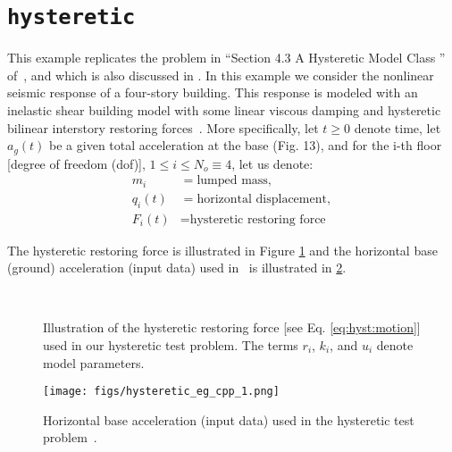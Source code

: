 \section{\texttt{hysteretic}}\label{sec:example_hysteretic}

This example replicates the problem in ``Section 4.3 A Hysteretic Model Class
'' of~\cite{CheungPrudencio2012}, and which is also discussed in \cite{Cheung_2009A}.
In this example we consider the nonlinear seismic response of a four-story building. 
This response is modeled with
an inelastic shear building model with some linear viscous damping and hysteretic bilinear interstory restoring forces~\cite{Cheung_2009A}. More
specifically, let $t\geq0 $ denote time, let $a_g(t)$ be a given total acceleration at the base (Fig. 13), and for the i-th floor [degree of freedom (dof)], $1 \leq i \leq N_o \equiv 4$, let us denote:
\begin{equation}
\begin{split}
m_i &= \text{lumped mass},\\
q_i(t) &= \text{horizontal displacement},\\
F_i(t) &= \text{hysteretic restoring force}
\end{split}
\end{equation}

The hysteretic restoring force is illustrated in Figure \ref{fig:hyst_rest_force} and the horizontal base (ground) acceleration (input data) used in~\cite{CheungPrudencio2012} is illustrated in \ref{hig:hist_base_acceleration}. 
\begin{figure}[h!]
\centerline{
\\
}
\caption{Illustration of the hysteretic restoring force [see Eq. \eqref{eq:hyst:motion}] used in our hysteretic test problem. The terms $r_i$, $k_i$, and $u_i$ denote model parameters.}
\label{fig:hyst_rest_force}
\end{figure}
%
\begin{figure}[hptb]
\centering
\texttt{[image: figs/hysteretic\_eg\_cpp\_1.png]}
\vspace{-8pt}
\caption{Horizontal base acceleration (input data) used in the hysteretic test problem~\cite{CheungPrudencio2012}.}
\label{hig:hist_base_acceleration}
\end{figure}

